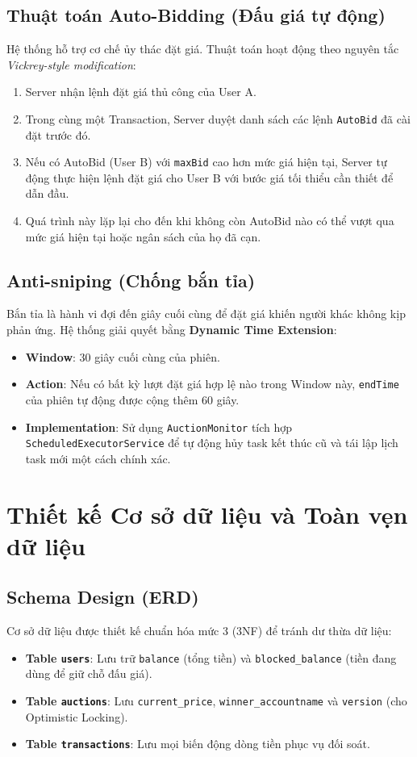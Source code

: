 \documentclass[12pt,a4paper]{article}
\begin{document}
\subsection{Thuật toán Auto-Bidding (Đấu giá tự động)}
Hệ thống hỗ trợ cơ chế ủy thác đặt giá. Thuật toán hoạt động theo nguyên tắc \textit{Vickrey-style modification}:
\begin{enumerate}
    \item Server nhận lệnh đặt giá thủ công của User A.
    \item Trong cùng một Transaction, Server duyệt danh sách các lệnh \texttt{AutoBid} đã cài đặt trước đó.
    \item Nếu có AutoBid (User B) với \texttt{maxBid} cao hơn mức giá hiện tại, Server tự động thực hiện lệnh đặt giá cho User B với bước giá tối thiểu cần thiết để dẫn đầu.
    \item Quá trình này lặp lại cho đến khi không còn AutoBid nào có thể vượt qua mức giá hiện tại hoặc ngân sách của họ đã cạn.
\end{enumerate}

\subsection{Anti-sniping (Chống bắn tỉa)}
Bắn tỉa là hành vi đợi đến giây cuối cùng để đặt giá khiến người khác không kịp phản ứng. Hệ thống giải quyết bằng \textbf{Dynamic Time Extension}:
\begin{itemize}
    \item \textbf{Window}: 30 giây cuối cùng của phiên.
    \item \textbf{Action}: Nếu có bất kỳ lượt đặt giá hợp lệ nào trong Window này, \texttt{endTime} của phiên tự động được cộng thêm 60 giây.
    \item \textbf{Implementation}: Sử dụng \texttt{AuctionMonitor} tích hợp \texttt{ScheduledExecutorService} để tự động hủy task kết thúc cũ và tái lập lịch task mới một cách chính xác.
\end{itemize}

\section{Thiết kế Cơ sở dữ liệu và Toàn vẹn dữ liệu}

\subsection{Schema Design (ERD)}
Cơ sở dữ liệu được thiết kế chuẩn hóa mức 3 (3NF) để tránh dư thừa dữ liệu:
\begin{itemize}
    \item \textbf{Table \texttt{users}}: Lưu trữ \texttt{balance} (tổng tiền) và \texttt{blocked\_balance} (tiền đang dùng để giữ chỗ đấu giá).
    \item \textbf{Table \texttt{auctions}}: Lưu \texttt{current\_price}, \texttt{winner\_accountname} và \texttt{version} (cho Optimistic Locking).
    \item \textbf{Table \texttt{transactions}}: Lưu mọi biến động dòng tiền phục vụ đối soát.
\end{itemize}
\end{document}
